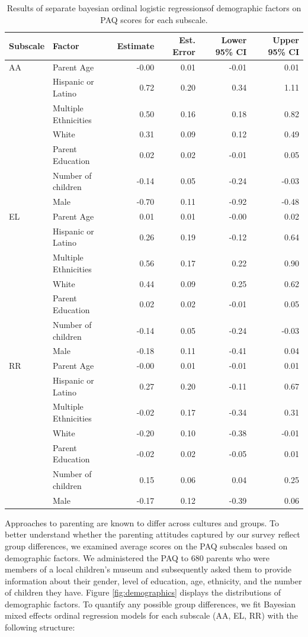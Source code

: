 \documentclass[floatsintext,man]{apa6}
\theoremstyle{definition}
\theoremstyle{definition}
\theoremstyle{definition}
\theoremstyle{remark}
\begin{document}
\begin{table}[h]
\centering
\begin{tabular}{llrrrr}
 Subscale & Factor & Estimate & Est. Error & Lower 95\% CI & Upper 95\% CI \\ 
  \hline
AA & Parent Age & -0.00 & 0.01 & -0.01 & 0.01 \\ 
   & Hispanic or Latino & 0.72 & 0.20 & 0.34 & 1.11 \\ 
   & Multiple Ethnicities & 0.50 & 0.16 & 0.18 & 0.82 \\ 
   & White & 0.31 & 0.09 & 0.12 & 0.49 \\ 
   & Parent Education & 0.02 & 0.02 & -0.01 & 0.05 \\ 
   & Number of children & -0.14 & 0.05 & -0.24 & -0.03 \\ 
   & Male & -0.70 & 0.11 & -0.92 & -0.48 \\ 
   \hline
EL & Parent Age & 0.01 & 0.01 & -0.00 & 0.02 \\ 
   & Hispanic or Latino & 0.26 & 0.19 & -0.12 & 0.64 \\ 
   & Multiple Ethnicities & 0.56 & 0.17 & 0.22 & 0.90 \\ 
   & White & 0.44 & 0.09 & 0.25 & 0.62 \\ 
   & Parent Education & 0.02 & 0.02 & -0.01 & 0.05 \\ 
   & Number of children & -0.14 & 0.05 & -0.24 & -0.03 \\ 
   & Male & -0.18 & 0.11 & -0.41 & 0.04 \\ 
   \hline
RR & Parent Age & -0.00 & 0.01 & -0.01 & 0.01 \\ 
   & Hispanic or Latino & 0.27 & 0.20 & -0.11 & 0.67 \\ 
   & Multiple Ethnicities & -0.02 & 0.17 & -0.34 & 0.31 \\ 
   & White & -0.20 & 0.10 & -0.38 & -0.01 \\ 
   & Parent Education & -0.02 & 0.02 & -0.05 & 0.01 \\ 
   & Number of children & 0.15 & 0.06 & 0.04 & 0.25 \\ 
   & Male & -0.17 & 0.12 & -0.39 & 0.06 \\ 
  \end{tabular}
\caption{Results of separate bayesian ordinal logistic regressionsof demographic factors on PAQ scores for each subscale.} 
\end{table}

Approaches to parenting are known to differ across cultures and groups.
To better understand whether the parenting attitudes captured by our
survey reflect group differences, we examined average scores on the PAQ
subscales based on demographic factors. We administered the PAQ to 680
parents who were members of a local children's museum and subsequently
asked them to provide information about their gender, level of
education, age, ethnicity, and the number of children they have. Figure
\ref{fig:demographics} displays the distributions of demographic
factors. To quantify any possible group differences, we fit Bayesian
mixed effects ordinal regression models for each subscale (AA, EL, RR)
with the following structure:
\end{document}
